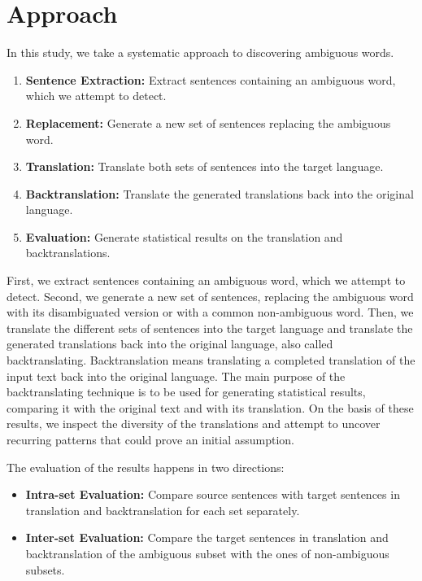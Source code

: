 \section{Approach}
\label{sec:Methodology:Approach}


In this study, we take a systematic approach to discovering ambiguous words. 

\begin{enumerate}
  \item \textbf{Sentence Extraction:} Extract sentences containing an ambiguous word, which we attempt to detect.
  \item \textbf{Replacement:} Generate a new set of sentences replacing the ambiguous word.
  \item \textbf{Translation:} Translate both sets of sentences into the target language.
  \item \textbf{Backtranslation:} Translate the generated translations back into the original language.
  \item \textbf{Evaluation:} Generate statistical results on the translation and backtranslations.
\end{enumerate}

First, we extract sentences containing an ambiguous word, which we attempt to detect. Second, we generate a new set of sentences, replacing the ambiguous word with its disambiguated version or with a common non-ambiguous word. Then, we translate the different sets of sentences into the target language and translate the generated translations back into the original language, also called backtranslating.
Backtranslation means translating a completed translation of the input text back into the original language. The main purpose of the backtranslating technique is to be used for generating statistical results, comparing it with the original text and with its translation. On the basis of these results, we inspect the diversity of the translations and attempt to uncover recurring patterns that could prove an initial assumption. 


The evaluation of the results happens in two directions:
\begin{itemize}
    \item \textbf{Intra-set Evaluation:} Compare source sentences with target sentences in translation and backtranslation for each set separately.
    \item \textbf{Inter-set Evaluation:} Compare the target sentences in translation and backtranslation of the ambiguous subset with the ones of non-ambiguous subsets.
\end{itemize}


